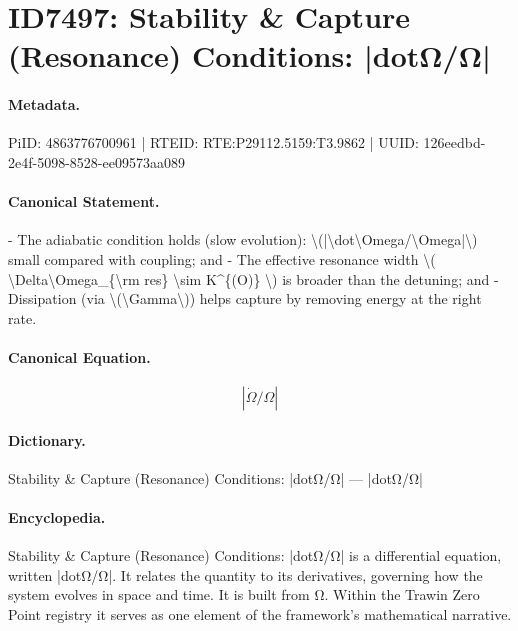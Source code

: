 \section*{ID7497: Stability \& Capture (Resonance) Conditions: |dotΩ/Ω|}
\paragraph{Metadata.}
PiID: 4863776700961 | RTEID: RTE:P29112.5159:T3.9862 | UUID: 126eedbd-2e4f-5098-8528-ee09573aa089

\paragraph{Canonical Statement.}
- The adiabatic condition holds (slow evolution): \textbackslash{}(|\textbackslash{}dot\textbackslash{}Omega/\textbackslash{}Omega|\textbackslash{}) small compared with coupling; and - The effective resonance width \textbackslash{}( \textbackslash{}Delta\textbackslash{}Omega\_\{\textbackslash{}rm res\} \textbackslash{}sim K\textasciicircum{}\{(O)\} \textbackslash{}) is broader than the detuning; and - Dissipation (via \textbackslash{}(\textbackslash{}Gamma\textbackslash{})) helps capture by removing energy at the right rate.

\paragraph{Canonical Equation.}
\[
|\dot\Omega/\Omega|
\]

\paragraph{Dictionary.}
Stability \& Capture (Resonance) Conditions: |dotΩ/Ω| — |dotΩ/Ω|

\paragraph{Encyclopedia.}
Stability \& Capture (Resonance) Conditions: |dotΩ/Ω| is a differential equation, written |dotΩ/Ω|. It relates the quantity to its derivatives, governing how the system evolves in space and time. It is built from Ω. Within the Trawin Zero Point registry it serves as one element of the framework's mathematical narrative.
